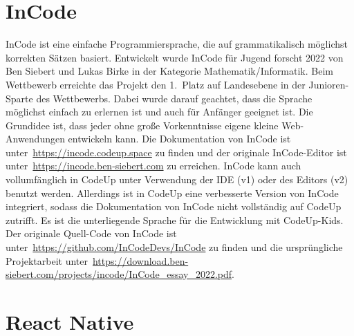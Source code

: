 \documentclass[main.tex]{subfiles}
\begin{document}
    \section{InCode}\label{sec:incodedoc}
    InCode ist eine einfache Programmiersprache, die auf grammatikalisch möglichst korrekten Sätzen basiert.
    Entwickelt wurde InCode für Jugend forscht 2022 von Ben Siebert und Lukas Birke in der Kategorie Mathematik/Informatik.
    Beim Wettbewerb erreichte das Projekt den 1.~Platz auf Landesebene in der Junioren-Sparte des Wettbewerbs.
    Dabei wurde darauf geachtet, dass die Sprache möglichst einfach zu erlernen ist und auch für Anfänger geeignet ist.
    Die Grundidee ist, dass jeder ohne große Vorkenntnisse eigene kleine Web-Anwendungen entwickeln kann.
    Die Dokumentation von InCode ist unter~\url{https://incode.codeup.space} zu finden und der originale InCode-Editor ist unter~\url{https://incode.ben-siebert.com} zu erreichen.
    InCode kann auch vollumfänglich in CodeUp unter Verwendung der IDE (v1) oder des Editors (v2) benutzt werden.
    Allerdings ist in CodeUp eine verbesserte Version von InCode integriert, sodass die Dokumentation von InCode nicht vollständig auf CodeUp zutrifft.
    Es ist die unterliegende Sprache für die Entwicklung mit CodeUp-Kids.
    Der originale Quell-Code von InCode ist unter~\url{https://github.com/InCodeDevs/InCode} zu finden und die ursprüngliche Projektarbeit unter~\url{https://download.ben-siebert.com/projects/incode/InCode_essay_2022.pdf}.
    \section{React Native}\label{sec:react-native}
\end{document}
